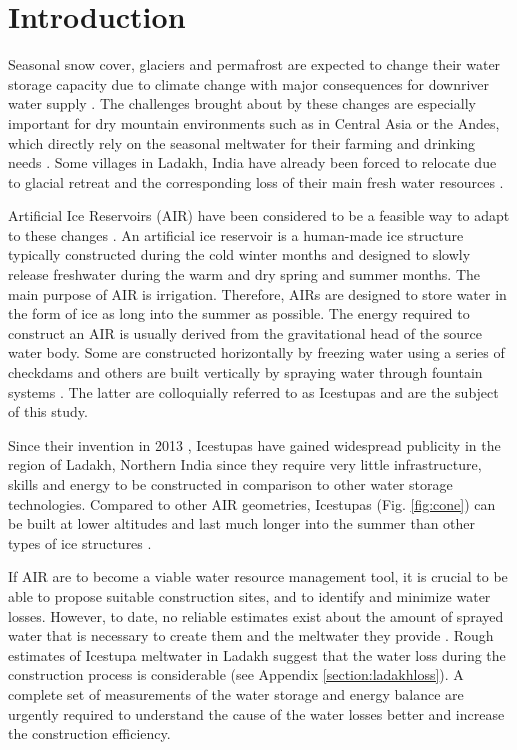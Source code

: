 \documentclass[utf8]{frontiersSCNS} %
\begin{document}
\section{Introduction}

Seasonal snow cover, glaciers and permafrost are expected to change their water storage capacity due to climate change
with major consequences for downriver water supply \citep{Immerzeel_2020}. The challenges brought about by these
changes are especially important for dry mountain environments such as in Central Asia or the Andes, which directly
rely on the seasonal meltwater for their farming and drinking needs \citep{HoelzleBarandun_2019, Apel_2018,
Buytaert_2017, Chen_2016, UNGERSHAYESTEH_2013}. Some villages in Ladakh, India have already been forced to relocate
due to glacial retreat and the corresponding loss of their main fresh water resources \citep{zanskar}. 

Artificial Ice Reservoirs (AIR) have been considered to be a feasible way to adapt to these changes \citep{IPCC_2019,
10.1659/MRD-JOURNAL-D-18-00072.1}. An artificial ice reservoir is a human-made ice structure typically constructed
during the cold winter months and designed to slowly release freshwater during the warm and dry spring and summer
months. The main purpose of AIR is irrigation. Therefore, AIRs are designed to store water in the form of ice as long
into the summer as possible. The energy required to construct an AIR is usually derived from the gravitational head of
the source water body. Some are constructed horizontally by freezing water using a series of checkdams and others are
built vertically by spraying water through fountain systems \citep{Nusser_2018}. The latter are colloquially referred
to as Icestupas and are the subject of this study.

Since their invention in 2013 \citep{campaign}, Icestupas have gained widespread publicity in the region of Ladakh,
Northern India since they require very little infrastructure, skills and energy to be constructed in comparison to
other water storage technologies. Compared to other AIR geometries, Icestupas (Fig.  \ref{fig:cone}) can be built at
lower altitudes and last much longer into the summer than other types of ice structures \citep{campaign}.

If AIR are to become a viable water resource management tool, it is crucial to be able to propose suitable construction
sites, and to identify and minimize water losses. However, to date, no reliable estimates exist about the amount of
sprayed water that is necessary to create them and the meltwater they provide \citep{Nusser_2018}. Rough estimates of
Icestupa meltwater in Ladakh suggest that the water loss during the construction process is considerable (see Appendix
\ref{section:ladakhloss}). A complete set of measurements of the water storage and energy balance are urgently required
to understand the cause of the water losses better and increase the construction efficiency.
 
\end{document}
